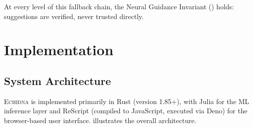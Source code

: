 \documentclass[11pt,a4paper]{article}
\newcommand{\echidna}{\textsc{Echidna}}
\begin{document}
At every level of this fallback chain, the Neural Guidance Invariant
() holds: suggestions are verified, never trusted directly.


\section{Implementation}
\label{sec:implementation}

\subsection{System Architecture}

\echidna{} is implemented primarily in Rust (version 1.85+), with Julia for the
ML inference layer and ReScript (compiled to JavaScript, executed via Deno) for
the browser-based user interface.  illustrates the
overall architecture.
\end{document}
